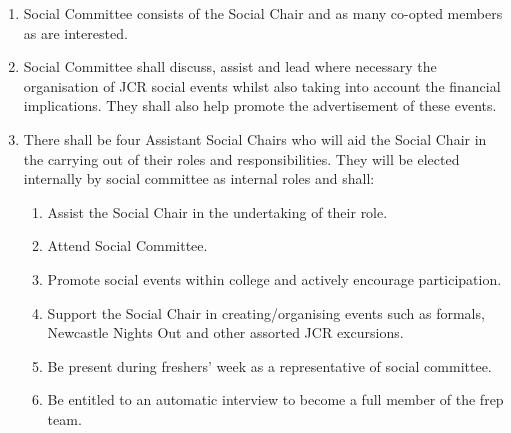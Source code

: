 \begin{enumerate}
    \item Social Committee consists of the Social Chair and as many co-opted members as are interested.
    \item Social Committee shall discuss, assist and lead where necessary the organisation of JCR social events whilst also taking into account the financial implications. They shall also help promote the advertisement of these events.
    \item There shall be four Assistant Social Chairs who will aid the Social Chair in the carrying out of their roles and responsibilities. They will be elected internally by social committee as internal roles and shall:
    \begin{enumerate}
        \item Assist the Social Chair in the undertaking of their role.
        \item Attend Social Committee.
        \item Promote social events within college and actively encourage participation.
        \item Support the Social Chair in creating/organising events such as formals, Newcastle Nights Out and other assorted JCR excursions.
        \item Be present during freshers’ week as a representative of social committee.
        \item Be entitled to an automatic interview to become a full member of the frep team.
    \end{enumerate}
   
\end{enumerate}



